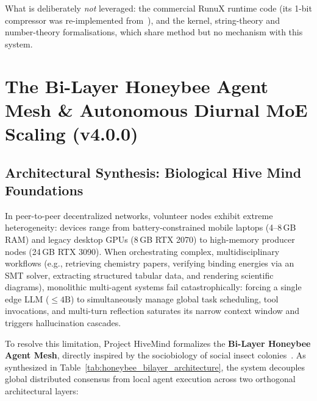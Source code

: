 \documentclass[11pt,a4paper]{article}
\begin{document}
What is deliberately \emph{not} leveraged: the commercial RunuX runtime code (its 1-bit compressor was re-implemented from~\cite{bernstein2018signsgd}), and the kernel, string-theory and number-theory formalisations, which share method but no mechanism with this system.

\section{The Bi-Layer Honeybee Agent Mesh \& Autonomous Diurnal MoE Scaling (v4.0.0)}
\label{sec:bee_agent_mesh_and_diurnal_scaling}

\subsection{Architectural Synthesis: Biological Hive Mind Foundations}
\label{sec:bee_mesh_foundations}

In peer-to-peer decentralized networks, volunteer nodes exhibit extreme heterogeneity: devices range from battery-constrained mobile laptops (4--8\,GB RAM) and legacy desktop GPUs (8\,GB RTX 2070) to high-memory producer nodes (24\,GB RTX 3090). When orchestrating complex, multidisciplinary workflows (e.g., retrieving chemistry papers, verifying binding energies via an SMT solver, extracting structured tabular data, and rendering scientific diagrams), monolithic multi-agent systems fail catastrophically: forcing a single edge LLM ($\le 4\text{B}$) to simultaneously manage global task scheduling, tool invocations, and multi-turn reflection saturates its narrow context window and triggers hallucination cascades.

To resolve this limitation, Project HiveMind formalizes the \textbf{Bi-Layer Honeybee Agent Mesh}, directly inspired by the sociobiology of social insect colonies~\cite{seeley2010honeybee,karaboga2005abc}. As synthesized in Table~\ref{tab:honeybee_bilayer_architecture}, the system decouples global distributed consensus from local agent execution across two orthogonal architectural layers:
\end{document}
